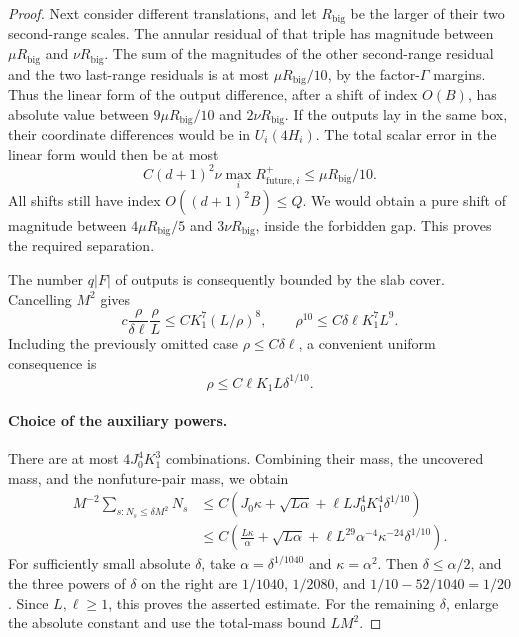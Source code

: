 \begin{proof}
Next consider different translations, and let $R_{\mathrm{big}}$
be the larger of their two second-range scales.  The annular
residual of that triple has magnitude between
$\mu R_{\mathrm{big}}$ and $\nu R_{\mathrm{big}}$.  The sum of the
magnitudes of the other second-range residual and the two
last-range residuals is at most $\mu R_{\mathrm{big}}/10$, by
the factor-$\Gamma$ margins.  Thus the linear form of the output
difference, after a shift of index $O(B)$, has absolute value
between $9\mu R_{\mathrm{big}}/10$ and $2\nu R_{\mathrm{big}}$.
If the outputs lay in the same box, their coordinate differences
would be in $U_i(4H_i)$.  The total scalar error in the linear form
would then be at most
\[
 C(d+1)^2\nu\max_i R_{\mathrm{future},i}^+
 \leq\mu R_{\mathrm{big}}/10.
\]
All shifts still have index $O((d+1)^2B)\leq Q$.  We would obtain
a pure shift of magnitude between
$4\mu R_{\mathrm{big}}/5$ and $3\nu R_{\mathrm{big}}$, inside the
forbidden gap.  This proves the required separation.

The number $q|F|$ of outputs is consequently bounded by the slab
cover.  Cancelling $M^2$ gives
\[
 c\frac{\rho}{\delta\ell}\frac{\rho}{L}
       \leq C K_1^7(L/\rho)^8,
 \qquad \rho^{10}\leq C\delta\ell K_1^7L^9.
\]
Including the previously omitted case $\rho\leq C\delta\ell$,
a convenient uniform consequence is
\[
 \rho\leq C\ell K_1L\delta^{1/10}.
\]

\paragraph{Choice of the auxiliary powers.}
There are at most $4J_0^4K_1^3$ combinations.  Combining their
mass, the uncovered mass, and the nonfuture-pair mass, we obtain
\[
 \begin{split}
 M^{-2}\sum_{s:N_s\leq\delta M^2}N_s
 &\leq C\left(J_0\kappa+\sqrt{L\alpha}
          +\ell L J_0^4K_1^4\delta^{1/10}\right)\\
 &\leq C\left(\frac{L\kappa}{\alpha}
         +\sqrt{L\alpha}
         +\ell L^{29}\alpha^{-4}\kappa^{-24}\delta^{1/10}\right).
 \end{split}
\]
For sufficiently small absolute $\delta$, take
$\alpha=\delta^{1/1040}$ and $\kappa=\alpha^2$.
Then $\delta\leq\alpha/2$, and the three powers of $\delta$ on
the right are $1/1040$, $1/2080$, and
$1/10-52/1040=1/20$.  Since $L,\ell\geq1$, this proves the
asserted estimate.  For the remaining $\delta$, enlarge the absolute
constant and use the total-mass bound $LM^2$.
\end{proof}

